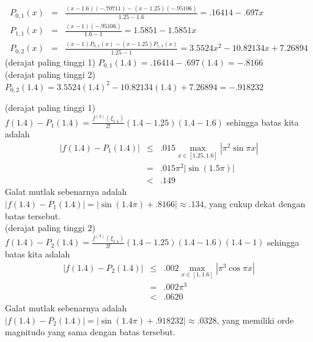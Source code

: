 \begin{description}
\begin{eqnarray*}
P_{0,1}(x) & = & \frac{(x-1.6)(-.70711)-(x-1.25)(-.95106)}{1.25-1.6}=.16414-.697x\\
P_{1,1}(x) & = & \frac{(x-1)(-.95106)}{1.6-1}=1.5851-1.5851x\\
P_{0,2}(x) & = & \frac{(x-1)P_{0,1}(x)-(x-1.25)P_{1,1}(x)}{1.25-1}=3.5524x^{2}-10.82134x+7.26894
\end{eqnarray*}
(derajat paling tinggi 1) $P_{0,1}(1.4)=.16414-.697(1.4)=-.8166$\\
(derajat paling tinggi 2) $P_{0,2}(1.4)=3.5524(1.4)^{2}-10.82134(1.4)+7.26894=-.918232$
\item [{\ref{exc:interpolation-lagrange-13}a:}] (derajat paling tinggi
1) $f(1.4)-P_{1}(1.4)=\frac{f^{(2)}(\xi_{1.4})}{2!}(1.4-1.25)(1.4-1.6)$
sehingga batas kita adalah 
\begin{eqnarray*}
|f(1.4)-P_{1}(1.4)| & \leq & .015\max_{x\in[1.25,1.6]}|\pi^{2}\sin\pi x|\\
 & = & .015\pi^{2}\left|\sin(1.5\pi)\right|\\
 & < & .149
\end{eqnarray*}
Galat mutlak sebenarnya adalah $|f(1.4)-P_{1}(1.4)|=|\sin(1.4\pi)+.8166|\approx.134$,
yang cukup dekat dengan batas tersebut.\\
(derajat paling tinggi 2) $f(1.4)-P_{2}(1.4)=\frac{f^{(3)}(\xi_{1.4})}{3!}(1.4-1.25)(1.4-1.6)(1.4-1)$
sehingga batas kita adalah
\begin{eqnarray*}
|f(1.4)-P_{2}(1.4)| & \leq & .002\max_{x\in[1,1.6]}|\pi^{3}\cos\pi x|\\
 & = & .002\pi^{3}\\
 & < & .0620
\end{eqnarray*}
Galat mutlak sebenarnya adalah $|f(1.4)-P_{2}(1.4)|=|\sin(1.4\pi)+.918232|\approx.0328$,
yang memiliki orde magnitudo yang sama dengan batas tersebut.
\end{description}

